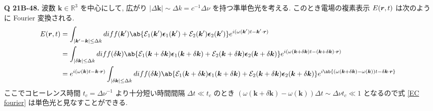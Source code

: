 \documentclass[uplatex,dvipdfmx,a4paper,11pt]{jlreq}
\newcommand{\RR}{\mathbb{R}}
\newcommand{\rr}{\bm{r}}
\newcommand{\kk}{\bm{k}}
\newcommand{\Ec}{\mathcal{E}}
\newcommand{\EC}{\mathcal\bm{E}}
\newcommand{\ee}{\bm{\epsilon}}
\theoremstyle{definition}
\begin{document}
\textbf{Q 21B-48.}
波数 $\kk\in\RR^3$ を中心にして, 広がり $|\Delta\kk|\sim\Delta k = c^{-1}\Delta\nu$ を持つ準単色光を考える. このとき電場の複素表示 $\EC(\rr, t)$ は次のように Fourier 変換される.
\begin{align}
  \EC(\rr, t)
   & = \int_{|\kk' - \kk|\leq\Delta k}diff(\kk')\ab\{\Ec_1(\kk')\ee_1(\kk') + \Ec_2(\kk')\ee_2(\kk')\}e^{i(\omega(\kk')t - \kk'\cdot\rr)}                                                                                                                                          \\
   & = \int_{|\delta\kk|\leq\Delta k}diff(\delta\kk)\ab\{\Ec_1(\kk + \delta\kk)\ee_1(\kk + \delta\kk) + \Ec_2(\kk + \delta\kk)\ee_2(\kk + \delta\kk)\}e^{i(\omega(\kk + \delta\kk)t - (\kk + \delta\kk)\cdot\rr)}                                                                  \\
   & = e^{i(\omega(\kk)t - \kk\cdot\rr)}\int_{|\delta\kk|\leq\Delta k}diff(\delta\kk)\ab\{\Ec_1(\kk + \delta\kk)\ee_1(\kk + \delta\kk) + \Ec_2(\kk + \delta\kk)\ee_2(\kk + \delta\kk)\}e^{i\ab\{(\omega(\kk + \delta\kk) - \omega(\kk))t - \delta\kk\cdot\rr\}} \label{EC fourier} \\
\end{align}
ここでコヒーレンス時間 $t_c = \Delta\nu^{-1}$ より十分短い時間間隔 $\Delta t \ll t_c$ のとき $(\omega(\kk + \delta\kk) - \omega(\kk))\Delta t \sim \Delta\nu t_c \ll 1$ となるので式 \eqref{EC fourier} は単色光と見なすことができる. \\
\end{document}

